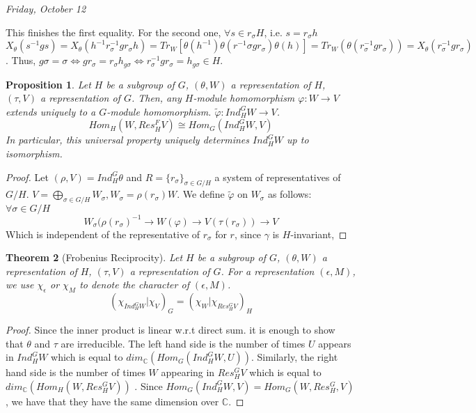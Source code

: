 \documentclass[letterpaper, leqno, 12pt]{article}
\newcommand{\bC} {\mathbb{C}}
\newcommand {\repV} {(\rho,V)}
\theoremstyle{stdthm}
\newtheorem{thm}{Theorem}
\newtheorem{prop}[thm]{Proposition}
\theoremstyle{stddef}
\theoremstyle{stdnonum}
\theoremstyle{stdqands}
\theoremstyle{stdbold}
\begin{document}
\begin{center}
\emph{Friday, October 12}
\end{center}
This finishes the first equality. For the second one, $\forall s \in r_\sigma H$, i.e. $s = r_\sigma h$ $X_\theta(s^{-1}gs) = X_\theta(h^{-1} r_\sigma^{-1}g r_\sigma h) = Tr_W [ \theta(h^{-1}) \theta(r^{-1}\sigma g r_\sigma) \theta(h)] = Tr_W(\theta(r_\sigma^{-1} g r_\sigma )) = X_\theta(r_\sigma^{-1} gr_\sigma)$.  Thus, $g\sigma = \sigma \Leftrightarrow g r_\sigma = r_\sigma h_{g\sigma} \Leftrightarrow r^{-1}_\sigma gr_\sigma = h_{g\sigma} \in H$. 

\begin{prop}
Let $H$ be a subgroup of $G$, $(\theta, W)$ a representation of $H$, $(\tau, V)$ a representation of $G$. Then, any $H$-module homomorphism $\varphi: W\rightarrow V$ extends uniquely to a $G$-module homomorphism. $\tilde{\varphi}: Ind_H^G W \rightarrow V$. 
\[ Hom_H(W, Res_H^F V) \cong Hom_G(Ind_H^G W, V) \] 
In particular, this universal property uniquely determines $Ind_H^G W$ up to isomorphism. 
\end{prop}

\begin{proof}
Let $\repV = Ind_H^G \theta$ and $R = \{r_\sigma\}_{\sigma \in G/H}$ a system of representatives of $G/H$.  $V = \bigoplus_{\sigma \in G/H} W_\sigma, W_\sigma = \rho(r_\sigma) W$. We define $\tilde{\varphi}$ on $W_\sigma$ as follows: $\forall \sigma \in G/H$ 
\[ W_{\sigma} (\rho(r_\sigma)^{-1} \rightarrow W (\varphi) \rightarrow V (\tau(r_\sigma)) \rightarrow V \]
Which is independent of the representative of $r_\sigma$ for $r$, since $\gamma$ is $H$-invariant, 
\end{proof}

\begin{thm}[Frobenius Reciprocity]
Let $H$ be a subgroup of $G$, $(\theta, W)$ a representation of $H$, $(\tau,V)$ a representation of $G$. For a representation $(\epsilon, M)$, we use $\chi_\epsilon$ or $\chi_M$ to denote the character of $(\epsilon, M)$.
\[ (\chi_{Ind_H^G W}| \chi_V)_G =  (\chi_W | \chi_{Res_H^G V})_H\] 

\end{thm}

\begin{proof}
Since the inner product is linear w.r.t direct sum. it is enough to show that $\theta$ and $\tau$ are irreducible. The left hand side is the number of times $U$ appears in $Ind_H^G W$ which is equal to $dim_\bC (Hom_G(Ind_H^G W,U))$. Similarly, the right hand side is the number of times $W$ appearing in $Res_H^G V$ which is equal to $dim_{\bC} (Hom_H(W, Res_H^G V))$ . Since $Hom_G(Ind_H^G W,V) = Hom_G(W, Res_H^G, V)$, we have that they have the same dimension over $\bC$. 
\end{proof} 
\end{document}
